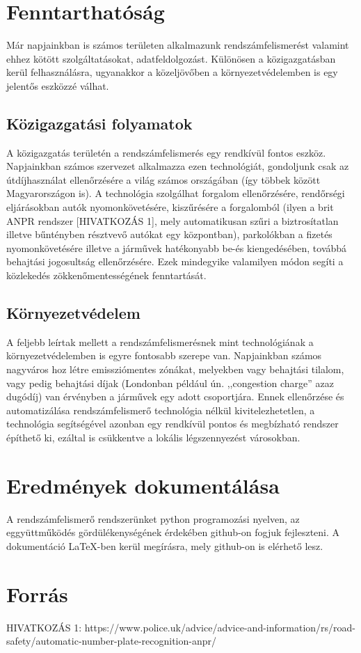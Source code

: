 \documentclass[12pt,a4paper]{article}
\begin{document}
    \section{Fenntarthatóság}

        Már napjainkban is számos területen alkalmazunk rendszámfelismerést valamint ehhez kötött szolgáltatásokat, adatfeldolgozást. Különösen a közigazgatásban kerül felhasználásra, ugyanakkor a közeljövőben a környezetvédelemben is egy jelentős eszközzé válhat.
        \subsection{Közigazgatási folyamatok}
            A közigazgatás területén a rendszámfelismerés egy rendkívül fontos eszköz. Napjainkban számos szervezet alkalmazza ezen technológiát, gondoljunk csak az útdíjhasználat ellenőrzésére a világ számos országában (így többek között Magyarországon is). A technológia szolgálhat forgalom ellenőrzésére, rendőrségi eljárásokban autók nyomonkövetésére, kiszűrésére a forgalomból (ilyen a brit ANPR rendszer [HIVATKOZÁS 1], mely automatikusan szűri a biztrosítatlan illetve bűntényben résztvevő autókat egy központban), parkolókban a fizetés nyomonkövetésére illetve a járművek hatékonyabb be-és kiengedésében, továbbá behajtási jogosultság ellenőrzésére. Ezek mindegyike valamilyen módon segíti a közlekedés zökkenőmentességének fenntartását.

        \subsection{Környezetvédelem}
            A feljebb leírtak mellett a rendszámfelismerésnek mint technológiának a környezetvédelemben is egyre fontosabb szerepe van. Napjainkban számos nagyváros hoz létre emissziómentes zónákat, melyekben vagy behajtási tilalom, vagy pedig behajtási díjak (Londonban például ún. ,,congestion charge'' azaz dugódíj) van érvényben a járművek egy adott csoportjára. Ennek ellenőrzése és automatizálása rendszámfelismerő technológia nélkül kivitelezhetetlen, a technológia segítségével azonban egy rendkívül pontos és megbízható rendszer építhető ki, ezáltal is csükkentve a lokális légszennyezést városokban.

    \section{Eredmények dokumentálása}
        A rendszámfelismerő rendszerünket python programozási nyelven, az eggyüttműködés gördülékenységének érdekében github-on fogjuk fejleszteni. A dokumentáció \LaTeX-ben kerül megírásra, mely github-on is elérhető lesz.

    \section{Forrás}

        HIVATKOZÁS 1:
        https://www.police.uk/advice/advice-and-information/rs/road-safety/automatic-number-plate-recognition-anpr/
\end{document}
